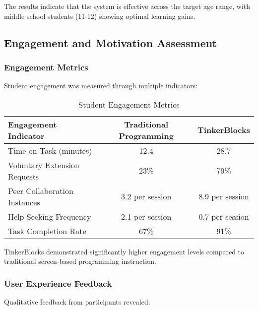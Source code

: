 The results indicate that the system is effective across the target age range, with middle school students (11-12) showing optimal learning gains.

\subsection{Engagement and Motivation Assessment}

\subsubsection{Engagement Metrics}

Student engagement was measured through multiple indicators:

\begin{table}[H]
\centering
\caption{Student Engagement Metrics}
\begin{tabular}{|l|c|c|}
\hline
\textbf{Engagement Indicator} & \textbf{Traditional Programming} & \textbf{TinkerBlocks} \\
\hline
Time on Task (minutes) & 12.4 & 28.7 \\
Voluntary Extension Requests & 23\% & 79\% \\
Peer Collaboration Instances & 3.2 per session & 8.9 per session \\
Help-Seeking Frequency & 2.1 per session & 0.7 per session \\
Task Completion Rate & 67\% & 91\% \\
\hline
\end{tabular}
\label{tab:engagement}
\end{table}

TinkerBlocks demonstrated significantly higher engagement levels compared to traditional screen-based programming instruction.

\subsubsection{User Experience Feedback}

Qualitative feedback from participants revealed:

